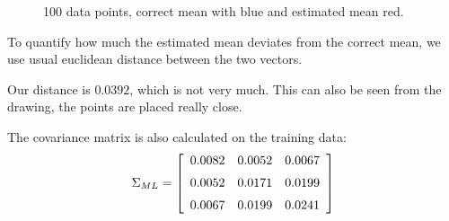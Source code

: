 \begin{figure}[!htpb]
  \centering
  \caption{100 data points, correct mean with blue and estimated mean red.}
  \label{fig:q1_1}
\end{figure}

To quantify how much the estimated mean deviates from the correct
mean, we use usual euclidean distance between the two vectors.

Our distance is $0.0392$, which is not very much. This can also be
seen from the drawing, the points are placed really close.

The covariance matrix is also calculated on the training data:\\
$$\Sigma _{ML} = \left[
  \begin {array}{ccc}
    0.0082 & 0.0052 & 0.0067\\
    \noalign{\medskip}
    0.0052 & 0.0171 & 0.0199\\
    \noalign{\medskip}
    0.0067 & 0.0199 & 0.0241\\
  \end {array}
  \right]$$
